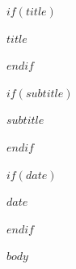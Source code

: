 \documentclass[11pt,a4paper]{article}
\begin{document}
$if(title)$
{\Huge\bfseries\color{TitleColor}$title$\par}
\vspace{0.6em}
$endif$

$if(subtitle)$
{\large\color{AccentColor}$subtitle$\par}
\vspace{1em}
$endif$

$if(date)$
{\small$date$\par}
\vspace{1em}
$endif$

\tableofcontents
\newpage

$body$
\end{document}

